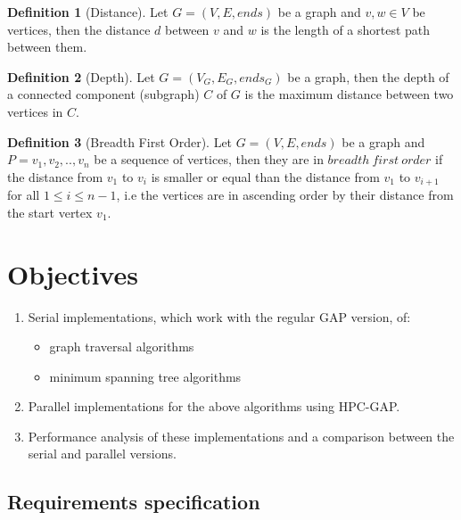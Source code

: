 \documentclass{report}
\theoremstyle{plain}
\theoremstyle{definition}
\newtheorem{definition}{Definition}
\theoremstyle{remark}
\begin{document}
\begin{definition}[Distance]
Let $G = (V, E, ends)$ be a graph and $v, w \in V$ be vertices, then the distance $d$ between $v$ and $w$ is the length of a shortest path between them. 
\end{definition}

\begin{definition}[Depth]
Let $G = (V_G, E_G, ends_G)$ be a graph, then the depth of a connected component (subgraph) $C$ of $G$ is the maximum distance between two vertices in $C$.
\end{definition}

\begin{definition}[Breadth First Order]
Let $G = (V, E, ends)$ be a graph and $P=v_1,v_2,..,v_n$ be a sequence of vertices, then they are in $breadth \ first \ order$ if the distance from $v_1$ to $v_i$ is smaller or equal than the distance from $v_1$ to $v_{i+1}$ for all $1 \leq i \leq n - 1$, i.e the vertices are in ascending order by their distance from the start vertex $v_1$.
\end{definition}

\chapter{Objectives}
\begin{enumerate}
  \item Serial implementations, which work with the regular GAP version, of:
  \begin{itemize}
    \item graph traversal algorithms
    \item minimum spanning tree algorithms
  \end{itemize}
  \item Parallel implementations for the above algorithms using HPC-GAP.
  \item Performance analysis of these implementations and a comparison between the serial and parallel versions.
\end{enumerate}

\section{Requirements specification}
\end{document}
